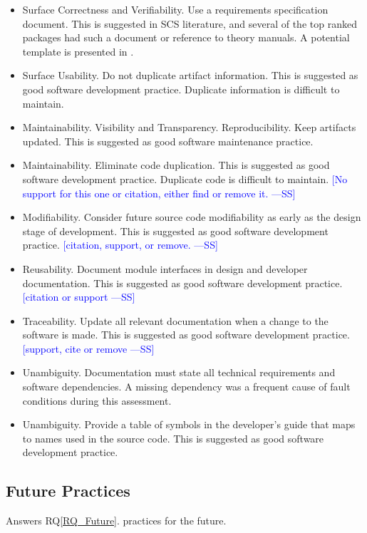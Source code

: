 \documentclass[final, 3p, times, authoryear]{elsarticle}
\newcommand{\authornote}[3]{\textcolor{#1}{[#3 ---#2]}}
\newcommand{\authornote}[3]{}
\newcommand{\wss}[1]{\authornote{blue}{SS}{#1}} %
\newcommand{\rqref}[1]{RQ\ref{#1}}
\begin{document}
\begin{itemize}
	\item Surface Correctness and Verifiability. Use a requirements
	specification document. This is suggested in SCS literature, and several of
	the top ranked packages had such a document or reference to theory manuals.
	A potential template is presented in \citep{smith2005new}. 
	\item Surface Usability. Do not duplicate artifact information. This is
	suggested as good software development practice. Duplicate information is
	difficult to maintain. 
	\item Maintainability. Visibility and Transparency. Reproducibility. Keep
	artifacts updated. This is suggested as good software maintenance practice.
	\item Maintainability. Eliminate code duplication. This is suggested as good
	software development practice. Duplicate code is difficult to maintain.
	\wss{No support for this one or citation, either find or remove it.}
	\item Modifiability. Consider future source code modifiability as early as
	the design stage of development. This is suggested as good software
	development practice. \wss{citation, support, or remove.}
	\item Reusability. Document module interfaces in design and developer
	documentation. This is suggested as good software development practice.
	\wss{citation or support}
	\item Traceability. Update all relevant documentation when a change to the
	software is made. This is suggested as good software development practice.
	\wss{support, cite or remove}
	\item Unambiguity. Documentation must state all technical requirements and
	software dependencies. A missing dependency was a frequent cause of fault
	conditions during this assessment.
	\item Unambiguity. Provide a table of symbols in the developer's guide that
	maps to names used in the source code. This is suggested as good software
	development practice.

\end{itemize}	

\subsection{Future Practices} \label{futurePractices}

Answers \rqref{RQ_Future}.  practices for the future.
\end{document}
